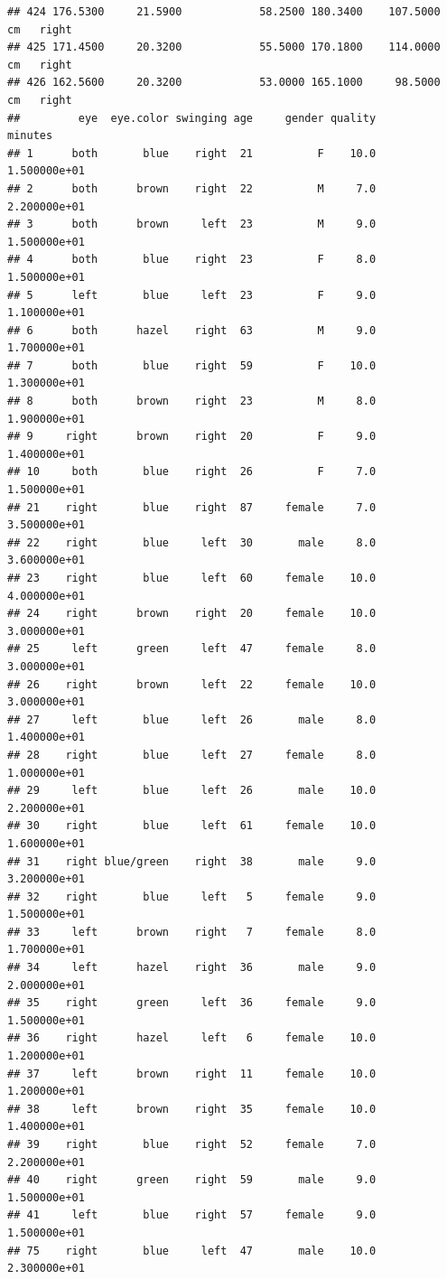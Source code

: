 \documentclass[]{article}
\begin{document}
\begin{verbatim}
## 424 176.5300     21.5900            58.2500 180.3400    107.5000     cm   right
## 425 171.4500     20.3200            55.5000 170.1800    114.0000     cm   right
## 426 162.5600     20.3200            53.0000 165.1000     98.5000     cm   right
##         eye  eye.color swinging age     gender quality       minutes
## 1      both       blue    right  21          F    10.0  1.500000e+01
## 2      both      brown    right  22          M     7.0  2.200000e+01
## 3      both      brown     left  23          M     9.0  1.500000e+01
## 4      both       blue    right  23          F     8.0  1.500000e+01
## 5      left       blue     left  23          F     9.0  1.100000e+01
## 6      both      hazel    right  63          M     9.0  1.700000e+01
## 7      both       blue    right  59          F    10.0  1.300000e+01
## 8      both      brown    right  23          M     8.0  1.900000e+01
## 9     right      brown    right  20          F     9.0  1.400000e+01
## 10     both       blue    right  26          F     7.0  1.500000e+01
## 21    right       blue    right  87     female     7.0  3.500000e+01
## 22    right       blue     left  30       male     8.0  3.600000e+01
## 23    right       blue     left  60     female    10.0  4.000000e+01
## 24    right      brown    right  20     female    10.0  3.000000e+01
## 25     left      green     left  47     female     8.0  3.000000e+01
## 26    right      brown     left  22     female    10.0  3.000000e+01
## 27     left       blue     left  26       male     8.0  1.400000e+01
## 28    right       blue     left  27     female     8.0  1.000000e+01
## 29     left       blue     left  26       male    10.0  2.200000e+01
## 30    right       blue     left  61     female    10.0  1.600000e+01
## 31    right blue/green    right  38       male     9.0  3.200000e+01
## 32    right       blue     left   5     female     9.0  1.500000e+01
## 33     left      brown    right   7     female     8.0  1.700000e+01
## 34     left      hazel    right  36       male     9.0  2.000000e+01
## 35    right      green     left  36     female     9.0  1.500000e+01
## 36    right      hazel     left   6     female    10.0  1.200000e+01
## 37     left      brown    right  11     female    10.0  1.200000e+01
## 38     left      brown    right  35     female    10.0  1.400000e+01
## 39    right       blue    right  52     female     7.0  2.200000e+01
## 40    right      green    right  59       male     9.0  1.500000e+01
## 41     left       blue    right  57     female     9.0  1.500000e+01
## 75    right       blue     left  47       male    10.0  2.300000e+01

\end{verbatim}
\end{document}
